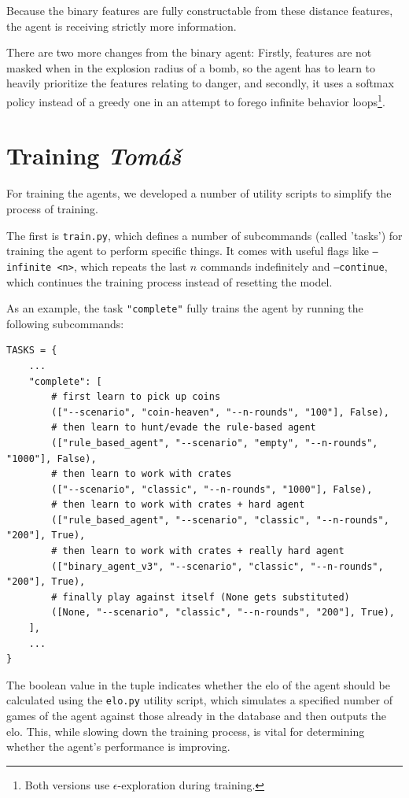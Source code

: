 \documentclass{article}
\begin{document}
Because the binary features are fully constructable from these distance features, the agent is receiving strictly more information.

There are two more changes from the binary agent: Firstly, features are not masked when in the explosion radius of a bomb, so the agent has to learn to heavily prioritize the features relating to danger, and secondly, it uses a softmax policy instead of a greedy one in an attempt to forego infinite behavior loops\footnote{Both versions use $\epsilon$-exploration during training.}.

\clearpage

\section[Training]{Training {\normalsize \normalfont \it \hfill Tomáš}}

For training the agents, we developed a number of utility scripts to simplify the process of training.

The first is \texttt{train.py}, which defines a number of subcommands (called 'tasks') for training the agent to perform specific things.
It comes with useful flags like \texttt{--infinite <n>}, which repeats the last $n$ commands indefinitely and \texttt{--continue}, which continues the training process instead of resetting the model.

As an example, the task \texttt{"complete"} fully trains the agent by running the following subcommands:
\begin{verbatim}
TASKS = {
    ...
    "complete": [
        # first learn to pick up coins
        (["--scenario", "coin-heaven", "--n-rounds", "100"], False),
        # then learn to hunt/evade the rule-based agent
        (["rule_based_agent", "--scenario", "empty", "--n-rounds", "1000"], False),
        # then learn to work with crates
        (["--scenario", "classic", "--n-rounds", "1000"], False),
        # then learn to work with crates + hard agent
        (["rule_based_agent", "--scenario", "classic", "--n-rounds", "200"], True),
        # then learn to work with crates + really hard agent
        (["binary_agent_v3", "--scenario", "classic", "--n-rounds", "200"], True),
        # finally play against itself (None gets substituted)
        ([None, "--scenario", "classic", "--n-rounds", "200"], True),
    ],
    ...
}
\end{verbatim}

The boolean value in the tuple indicates whether the elo of the agent should be calculated using the \texttt{elo.py} utility script, which simulates a specified number of games of the agent against those already in the database and then outputs the elo.
This, while slowing down the training process, is vital for determining whether the agent's performance is improving.
\end{document}
